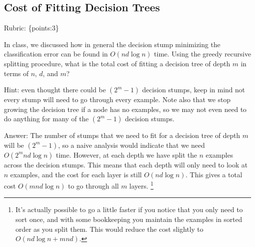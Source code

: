 \documentclass{article}
\def\ans#1{\par\gre{Answer: #1}}
\def\answer#1{\ans{#1}}
\def\rubric#1{\gre{Rubric: \{#1\}}}{}
\def\blu#1{{\color{blu}#1}}
\def\gre#1{{\color{gre}#1}}
\begin{document}
	\subsection{Cost of Fitting Decision Trees}
	\rubric{points:3}
	
	In class, we discussed how in general the decision stump minimizing the classification error can be found in $O(nd\log n)$ time.
	Using the greedy recursive splitting procedure, \blu{what is the total cost of fitting a decision tree of depth $m$ in terms of $n$, $d$, and $m$?}
	
	Hint: even thought there could be $(2^m-1)$ decision stumps, keep in mind not every stump will need to go through every example. Note also that we stop growing the decision tree if a node has no examples, so we may not even need to do anything for many of the $(2^m-1)$ decision stumps.
	
	\answer{The number of stumps that we need to fit for a decision tree of depth $m$ will be $(2^m-1)$,
		so a naive analysis would indicate that we need $O(2^mnd\log n)$ time.
		However, at each depth we have split the $n$ examples across the decision stumps.
		This means that each depth will only need to look at $n$ examples,
		and the cost for each layer is still $O(nd\log n)$.
		This gives a total cost $O(mnd\log n)$ to go through all $m$ layers.
		\footnote{It's actually possible to go a little faster if you notice that you only need to sort once,
			and with some bookkeeping you maintain the examples in sorted order as you split them. This would reduce the cost slightly to $O(nd\log n + mnd)$.}}
	
	
\end{document}
